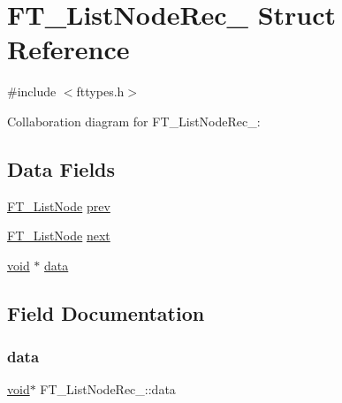 \hypertarget{struct_f_t___list_node_rec__}{}\section{F\+T\+\_\+\+List\+Node\+Rec\+\_\+ Struct Reference}
\label{struct_f_t___list_node_rec__}


{\ttfamily \#include $<$fttypes.\+h$>$}



Collaboration diagram for F\+T\+\_\+\+List\+Node\+Rec\+\_\+\+:
\subsection*{Data Fields}
\begin{DoxyCompactItemize}
\item 
\hyperlink{fttypes_8h_a155e4980a42c16fbc221ad40b2b59695}{F\+T\+\_\+\+List\+Node} \hyperlink{struct_f_t___list_node_rec___a41c77950e6940b1b98e04709b705c046}{prev}
\item 
\hyperlink{fttypes_8h_a155e4980a42c16fbc221ad40b2b59695}{F\+T\+\_\+\+List\+Node} \hyperlink{struct_f_t___list_node_rec___a8275962fa8c92b77435cb4fa76251f39}{next}
\item 
\hyperlink{png_8h_ac9c84fa68bbad002983e35ce3663c686}{void} $\ast$ \hyperlink{struct_f_t___list_node_rec___ab0202be88f722442a4bec9aeb5f6418f}{data}
\end{DoxyCompactItemize}


\subsection{Field Documentation}
\mbox{\label{struct_f_t___list_node_rec___ab0202be88f722442a4bec9aeb5f6418f}} 
\subsubsection{\texorpdfstring{data}{data}}
{\footnotesize\ttfamily \hyperlink{png_8h_ac9c84fa68bbad002983e35ce3663c686}{void}$\ast$ F\+T\+\_\+\+List\+Node\+Rec\+\_\+\+::data}

\mbox{\label{struct_f_t___list_node_rec___a8275962fa8c92b77435cb4fa76251f39}} 

